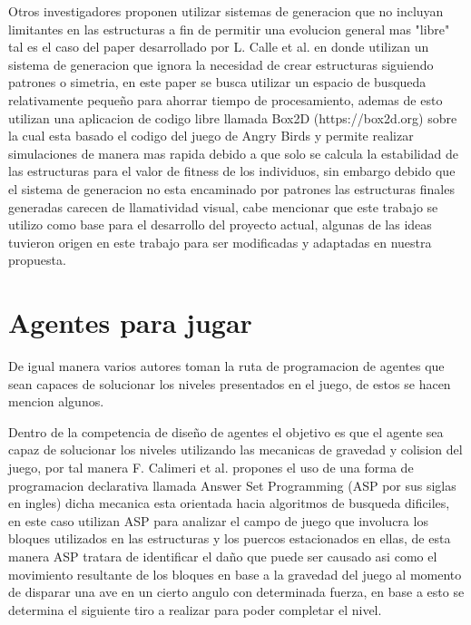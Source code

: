 Otros investigadores proponen utilizar sistemas de generacion que no incluyan
limitantes en las estructuras a fin de permitir una evolucion general mas
"libre" tal es el caso del paper desarrollado por L. Calle et al.
\cite{Calle2019} en donde utilizan un sistema de generacion que ignora la
necesidad de crear estructuras siguiendo patrones o simetria, en este paper se
busca utilizar un espacio de busqueda relativamente pequeño para ahorrar tiempo
de procesamiento, ademas de esto utilizan una aplicacion de codigo libre llamada
Box2D (https://box2d.org) sobre la cual esta basado el codigo del juego de Angry
Birds y permite realizar simulaciones de manera mas rapida debido a que solo se
calcula la estabilidad de las estructuras para el valor de fitness de los
individuos, sin embargo debido que el sistema de generacion no esta encaminado
por patrones las estructuras finales generadas carecen de llamatividad visual,
cabe mencionar que este trabajo se utilizo como base para el desarrollo del
proyecto actual, algunas de las ideas tuvieron origen en este trabajo para ser
modificadas y adaptadas en nuestra propuesta.

\section{Agentes para jugar}
\label{section:others}

De igual manera varios autores toman la ruta de programacion de agentes que sean
capaces de solucionar los niveles presentados en el juego, de estos se hacen
mencion algunos.

Dentro de la competencia de diseño de agentes el objetivo es que el agente sea
capaz de solucionar los niveles utilizando las mecanicas de gravedad y colision
del juego, por tal manera F. Calimeri et al. \cite{Calimeri2016} propones el uso
de una forma de programacion declarativa llamada Answer Set Programming (ASP por
sus siglas en ingles) dicha mecanica esta orientada hacia algoritmos de busqueda
dificiles, en este caso utilizan ASP para analizar el campo de juego que
involucra los bloques utilizados en las estructuras y los puercos estacionados
en ellas, de esta manera ASP tratara de identificar el daño que puede ser
causado asi como el movimiento resultante de los bloques en base a la gravedad
del juego al momento de disparar una ave en un cierto angulo con determinada
fuerza, en base a esto se determina el siguiente tiro a realizar para poder
completar el nivel. 

